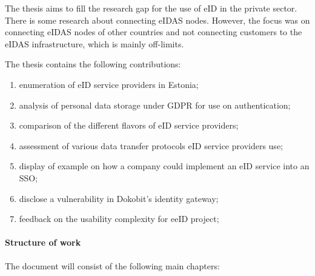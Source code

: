 The thesis aims to fill the research gap for the use of eID in the private sector. There is some research about connecting eIDAS nodes. However, the focus was on connecting eIDAS nodes of other countries and not connecting customers to the eIDAS infrastructure, which is mainly off-limits.

The thesis contains the following contributions:

\begin{enumerate}
    \item enumeration of eID service providers in Estonia;
    \item analysis of personal data storage under GDPR for use on authentication;
    \item comparison of the different flavors of eID service providers;
    \item assessment of various data transfer protocols eID service providers use;
    \item display of example on how a company could implement an eID service into an SSO;
    \item disclose a vulnerability in Dokobit's identity gateway;
    \item feedback on the usability complexity for eeID project;
\end{enumerate}





\paragraph{Structure of work}
The document will consist of the following main chapters:

